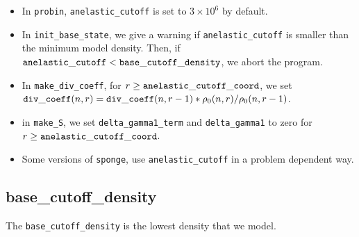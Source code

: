 \begin{itemize}

\item In {\tt probin}, {\tt anelastic\_cutoff} is set to $3\times 10^6$ by default.

\item In {\tt init\_base\_state}, we give a warning if {\tt anelastic\_cutoff}
  is smaller than the minimum model density.  Then, if ${\tt anelastic\_cutoff} 
  < {\tt base\_cutoff\_density}$, we abort the program.

\item In {\tt make\_div\_coeff}, for 
  $r \ge {\tt anelastic\_cutoff\_coord}$, we set
  ${\tt div\_coeff}(n,r) = {\tt div\_coeff}(n,r-1) * \rho_0(n,r)/\rho_0(n,r-1)$.

\item in {\tt make\_S}, we set {\tt delta\_gamma1\_term} and {\tt delta\_gamma1} 
  to zero for $r \ge {\tt anelastic\_cutoff\_coord}$.

\item Some versions of {\tt sponge}, use {\tt anelastic\_cutoff} in a problem dependent way.

\end{itemize}

\subsection{base\_cutoff\_density}\label{Sec:Base Cutoff Density}

The {\tt base\_cutoff\_density} is the lowest density that we model.

